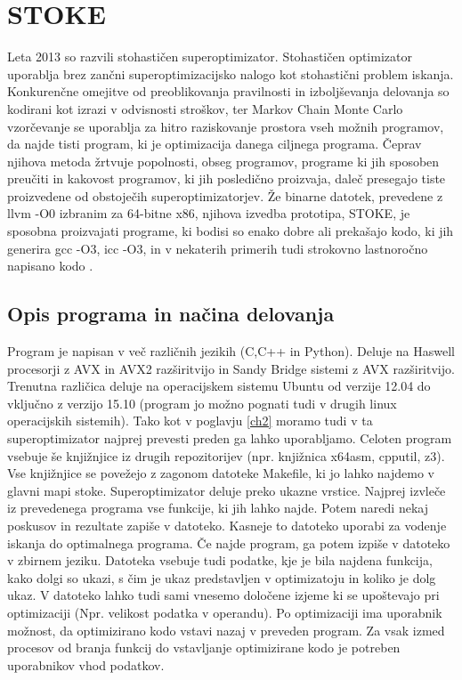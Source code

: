 \documentclass[a4paper, 12pt]{book}
\begin{document}
	\chapter{STOKE}
	\label{ch3}
	Leta 2013 so razvili stohastičen superoptimizator. Stohastičen optimizator uporablja brez zančni superoptimizacijsko nalogo kot stohastični problem iskanja. Konkurenčne omejitve od preoblikovanja pravilnosti in izboljševanja delovanja so kodirani kot izrazi v odvisnosti stroškov, ter Markov Chain Monte Carlo vzorčevanje se uporablja za hitro raziskovanje prostora vseh možnih programov, da najde tisti program, ki je optimizacija danega ciljnega programa. Čeprav njihova metoda žrtvuje popolnosti, obseg programov, programe ki jih sposoben preučiti in kakovost programov, ki jih posledično proizvaja, daleč presegajo tiste proizvedene od obstoječih superoptimizatorjev. Že binarne datotek, prevedene z  llvm -O0 izbranim za 64-bitne x86, njihova izvedba prototipa, STOKE, je sposobna proizvajati programe, ki bodisi so enako dobre ali prekašajo kodo, ki jih generira gcc -O3, icc -O3, in v nekaterih primerih tudi strokovno lastnoročno napisano kodo \cite{article1,article5}.
	\section{Opis programa in načina delovanja}
	\label{lab1}
	Program je napisan v več različnih jezikih (C,C++ in Python). Deluje na Haswell procesorji z AVX in AVX2 razširitvijo in Sandy Bridge sistemi z AVX razširitvijo. Trenutna različica deluje na operacijskem sistemu Ubuntu od verzije 12.04 do vključno z verzijo 15.10 (program jo možno pognati tudi v drugih linux operacijskih sistemih). Tako kot v poglavju \ref{ch2} moramo tudi v ta superoptimizator najprej prevesti preden ga lahko uporabljamo. Celoten program vsebuje še knjižnjice iz drugih repozitorijev (npr. knjižnica x64asm, cpputil, z3). Vse knjižnjice se povežejo z zagonom datoteke Makefile, ki jo lahko najdemo v glavni mapi stoke. Superoptimizator deluje preko ukazne vrstice. Najprej izvleče iz prevedenega programa vse funkcije, ki jih lahko najde. Potem naredi nekaj poskusov in rezultate zapiše v datoteko. Kasneje to datoteko uporabi za vodenje iskanja do optimalnega programa. Če najde program, ga potem izpiše v datoteko v zbirnem jeziku. Datoteka vsebuje tudi podatke, kje je bila najdena funkcija, kako dolgi so ukazi, s čim je ukaz predstavljen v optimizatoju in koliko je dolg ukaz. V datoteko lahko tudi sami vnesemo določene izjeme ki se upoštevajo pri optimizaciji (Npr. velikost podatka v operandu). Po optimizaciji ima uporabnik možnost, da optimizirano kodo vstavi nazaj v preveden program. Za vsak izmed procesov od branja funkcij do vstavljanje optimizirane kodo je potreben uporabnikov vhod podatkov.
\end{document}
